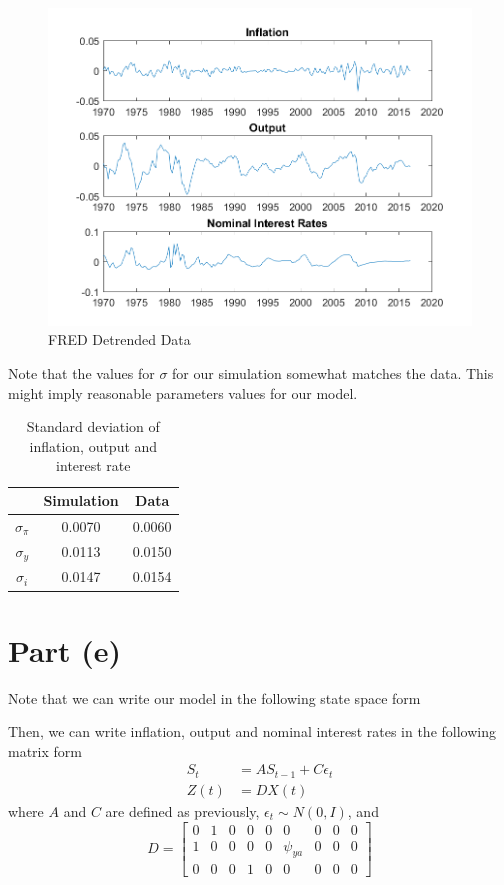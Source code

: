 \documentclass[12pt]{article}
\theoremstyle{definition}
\newcommand{\bra}[1]{\left[#1\right]}
\newcommand{\mat}[1]{\begin{matrix}#1\end{matrix}}
\newcommand{\bmat}[1]{\bra{\mat{#1}}}
\begin{document}
\begin{figure}[H]
	\centering
	\includegraphics[width=\linewidth]{data}
	\caption{FRED Detrended Data}
	\label{fig:data}
\end{figure}

Note that the values for $\sigma$ for our simulation somewhat matches the data. This might imply reasonable parameters values for our model.

\begin{table}[H]
	\centering
\begin{tabular}{c|c|c}
	\hline 
	& Simulation & Data \\ 
	\hline 
	$\sigma_{\pi}$ & 0.0070    &  0.0060  \\ 
	$\sigma_{y}$ & 0.0113    & 0.0150 \\ 
	$\sigma_{i}$ &   0.0147 &  0.0154\\ 
	\hline 
\end{tabular} 
	\caption{Standard deviation of inflation, output and interest rate}
\label{tab:sigma}
\end{table}
\section*{Part (e)}

Note that we can write our model in the following state space form

Then, we can write inflation, output and nominal interest rates in the following matrix form
\begin{align*}
S_t &= A S_{t-1} + C \epsilon_t\\
Z(t) &= DX(t)
\end{align*}
where $A$ and $C$ are defined as previously, $\epsilon_t\sim N(0,I)$, and
\[
D = \bmat{0& 1& 0& 0& 0& 0& 0& 0& 0\\
	1& 0& 0& 0& 0& \psi_{ya}& 0& 0& 0\\
	0 &0& 0& 1& 0& 0& 0& 0& 0}
\]
\end{document}
